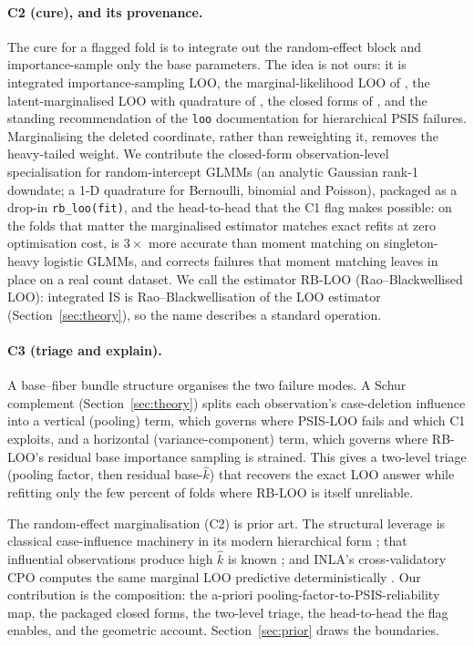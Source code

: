 \documentclass[11pt]{article}
\newcommand{\khat}{\hat{k}}
\begin{document}
\paragraph{C2 (cure), and its provenance.} The cure for a flagged fold is to
integrate out the random-effect block and importance-sample only the base
parameters. The idea is not ours: it is integrated importance-sampling LOO, the
marginal-likelihood LOO of \citet{merkle2019bayesian}, the latent-marginalised LOO
with quadrature of \citet{vehtari2016glvm}, the closed forms of
\citet{burkner2021efficient}, and the standing recommendation of the \texttt{loo}
documentation for hierarchical PSIS failures. Marginalising the deleted coordinate,
rather than reweighting it, removes the heavy-tailed weight. We contribute the
closed-form observation-level specialisation for random-intercept GLMMs (an analytic
Gaussian rank-1 downdate; a 1-D quadrature for Bernoulli, binomial and Poisson),
packaged as a drop-in \texttt{rb\_loo(fit)}, and the head-to-head that the C1 flag
makes possible: on the folds that matter the marginalised estimator matches exact
refits at zero optimisation cost, is $3\times$ more accurate than moment matching
\citep{paananen2021implicitly} on singleton-heavy logistic GLMMs, and corrects
failures that moment matching leaves in place on a real count dataset. We call the
estimator RB-LOO (Rao--Blackwellised LOO): integrated IS is Rao--Blackwellisation of
the LOO estimator (Section~\ref{sec:theory}), so the name describes a standard
operation.

\paragraph{C3 (triage and explain).} A base--fiber bundle structure
\citep{bindoff2026fibr} organises the two failure modes. A Schur complement
(Section~\ref{sec:theory}) splits each observation's case-deletion influence into a
vertical (pooling) term, which governs where PSIS-LOO fails and which C1 exploits,
and a horizontal (variance-component) term, which governs where RB-LOO's residual
base importance sampling is strained. This gives a two-level triage (pooling factor,
then residual base-$\khat$) that recovers the exact LOO answer while refitting only
the few percent of folds where RB-LOO is itself unreliable.

The random-effect marginalisation (C2) is prior art. The structural leverage is
classical case-influence machinery \citep{wei1998generalized} in its modern
hierarchical form \citep{lovison2026augmented}; that influential observations produce
high $\khat$ is known \citep{peruggia1997variance, vehtari2017practical}; and INLA's
cross-validatory CPO computes the same marginal LOO predictive deterministically
\citep{rue2009inla, held2010posterior}. Our contribution is the composition: the
a-priori pooling-factor-to-PSIS-reliability map, the packaged closed forms, the
two-level triage, the head-to-head the flag enables, and the geometric account.
Section~\ref{sec:prior} draws the boundaries.
\end{document}
